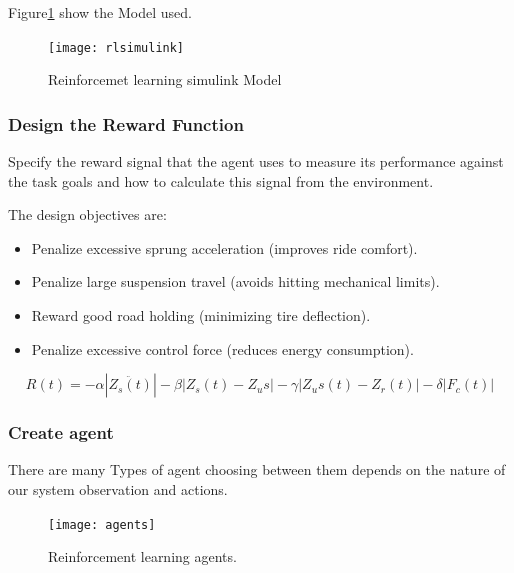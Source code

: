 Figure\ref{fig:rlm} show the Model used.
\begin{figure}[H]
	\centering
	\texttt{[image: rlsimulink]}
	\caption{Reinforcemet learning simulink Model}
	\label{fig:rlm}
\end{figure}

\subsubsection{Design the Reward Function}
Specify the reward signal that the agent uses to measure its performance against the task goals and how to calculate this signal from the environment.

The design objectives are:
\begin{itemize}
	\item Penalize excessive sprung acceleration (improves ride comfort).
	\item Penalize large suspension travel (avoids hitting mechanical limits).
	\item Reward good road holding (minimizing tire deflection).
	\item Penalize excessive control force (reduces energy consumption).
\end{itemize}
\begin{equation}
	R(t) = -\alpha |\ddot{Z_s(t)}| - \beta |Z_s(t) - Z_us| - \gamma |Z_us(t) - Z_r(t)| - \delta |F_c(t)|
\end{equation}

\newpage
\subsubsection{Create agent}
There are many Types of agent choosing between them depends on the nature of our system observation and actions.
\begin{figure}[H]
	\centering
	\texttt{[image: agents]}
	\caption{Reinforcement learning agents. \cite{agents}
	}
\end{figure}

